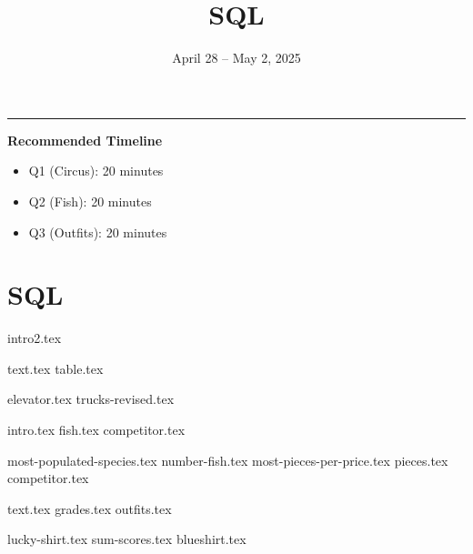 \documentclass{exam}
\title{SQL}
\date{April 28 -- May 2, 2025}
\begin{document}
\maketitle\rule{\textwidth}{0.15em}

\begin{guide}
    \textbf{Recommended Timeline}
    \begin{itemize}
        \item Q1 (Circus): 20 minutes
        \item Q2 (Fish): 20 minutes
        \item Q3 (Outfits): 20 minutes 
    \end{itemize}
\end{guide}

\section{SQL}
{intro2.tex}

\newpage
\begin{questions}

  \question
  {text.tex}
  {table.tex}
  \begin{parts}
    {elevator.tex}
    {trucks-revised.tex}
  \end{parts}
  
  \newpage
  \question 
  {intro.tex}
  {fish.tex}
  {competitor.tex}
  \begin{parts}
    {most-populated-species.tex}
    {number-fish.tex}
    {most-pieces-per-price.tex}
    {pieces.tex}
    {competitor.tex}
  \end{parts}
  \question
  {text.tex}
  {grades.tex}
  {outfits.tex}
  \begin{parts}
    {lucky-shirt.tex}
    {sum-scores.tex}
    {blueshirt.tex}
  \end{parts}
\end{questions}
\end{document}
